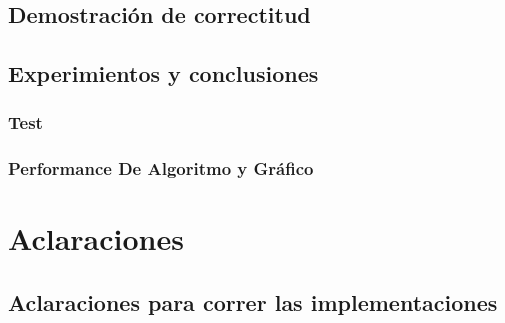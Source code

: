 \documentclass[12pt, a4paper]{article}
\begin{document}
\subsection{Demostraci\'on de correctitud}
%

\subsection{Experimientos y conclusiones}
\subsubsection[2.5]{Test}

\subsubsection[2.5]{Performance De Algoritmo y Gr\'afico}


\newpage
\section{Aclaraciones} 
\subsection{Aclaraciones para correr las implementaciones}

\end{document}
